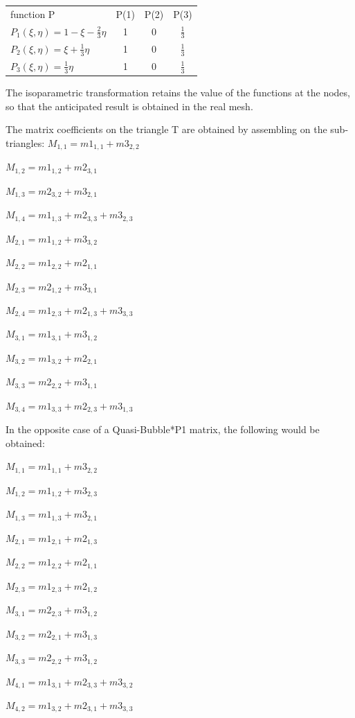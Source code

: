 \begin{tabular}{lccc}
function P & P(1) & P(2) &  P(3) \\
  $P_{1}(\xi,\eta) = 1 - \xi - \frac{2}{3} \eta$ & 1 & 0 & $\frac{1}{3}$ \\
  $P_{2}(\xi,\eta) = \xi + \frac{1}{3} \eta$ & 1 & 0 & $\frac{1}{3}$ \\
  $P_{3}(\xi,\eta) = \frac{1}{3} \eta$ & 1 & 0 & $\frac{1}{3}$
\end{tabular}

The isoparametric transformation retains the value of the functions at the
nodes, so that the anticipated result is obtained in the real mesh.

The matrix coefficients on the triangle T are obtained by assembling on the
sub-triangles:
$M_{1,1} = m1_{1,1} + m3_{2,2}$

$M_{1,2} = m1_{1,2} + m2_{3,1}$

$M_{1,3} = m2_{3,2} + m3_{2,1}$

$M_{1,4} = m1_{1,3} + m2_{3,3} + m3_{2,3}$

$M_{2,1} = m1_{1,2} + m3_{3,2}$

$M_{2,2} = m1_{2,2} + m2_{1,1}$

$M_{2,3} = m2_{1,2} + m3_{3,1}$

$M_{2,4} = m1_{2,3} + m2_{1,3} + m3_{3,3}$

$M_{3,1} = m1_{3,1} + m3_{1,2}$

$M_{3,2} = m1_{3,2} + m2_{2,1}$

$M_{3,3} = m2_{2,2} + m3_{1,1}$

$M_{3,4} = m1_{3,3} + m2_{2,3} + m3_{1,3}$

In the opposite case of a Quasi-Bubble*P1 matrix, the following would be obtained:

$M_{1,1} = m1_{1,1} + m3_{2,2}$

$M_{1,2} = m1_{1,2} + m3_{2,3}$

$M_{1,3} = m1_{1,3} + m3_{2,1}$

$M_{2,1} = m1_{2,1} + m2_{1,3}$

$M_{2,2} = m1_{2,2} + m2_{1,1}$

$M_{2,3} = m1_{2,3} + m2_{1,2}$

$M_{3,1} = m2_{2,3} + m3_{1,2}$

$M_{3,2} = m2_{2,1} + m3_{1,3}$

$M_{3,3} = m2_{2,2} + m3_{1,2}$

$M_{4,1} = m1_{3,1} + m2_{3,3} + m3_{3,2}$

$M_{4,2} = m1_{3,2} + m2_{3,1} + m3_{3,3}$


